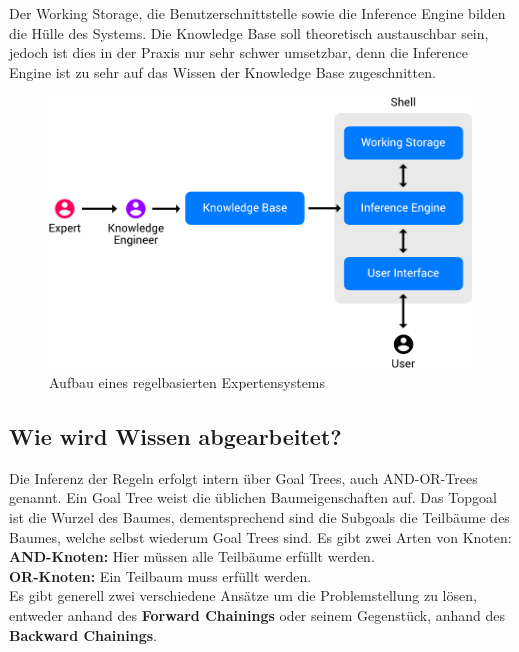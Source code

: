 \noindent Der Working Storage, die Benutzerschnittstelle sowie die Inference Engine bilden die Hülle des Systems. Die Knowledge Base soll theoretisch austauschbar sein, jedoch ist dies in der Praxis nur sehr schwer umsetzbar, denn die Inference Engine ist zu sehr auf das Wissen der Knowledge Base zugeschnitten.

\begin{figure}[H]
    \centering
    \includegraphics[width=17cm]{chapters/expertensysteme/aufbau_expertensystem}
    \caption{Aufbau eines regelbasierten Expertensystems}
    \label{fig:aufbau}
\end{figure}

\subsection{Wie wird Wissen abgearbeitet?}
\noindent Die Inferenz der Regeln erfolgt intern über Goal Trees, auch AND-OR-Trees genannt. Ein Goal Tree weist die üblichen Baumeigenschaften auf. Das Topgoal ist die Wurzel des Baumes, dementsprechend sind die Subgoals die Teilbäume des Baumes, welche selbst wiederum Goal Trees sind. Es gibt zwei Arten von Knoten:\\

\noindent \textbf{AND-Knoten:} Hier müssen alle Teilbäume erfüllt werden.\\
\textbf{OR-Knoten:} Ein Teilbaum muss erfüllt werden.\\

\noindent Es gibt generell zwei verschiedene Ansätze um die Problemstellung zu lösen, entweder anhand des \textbf{Forward Chainings} oder seinem Gegenstück, anhand des \textbf{Backward Chainings}.



